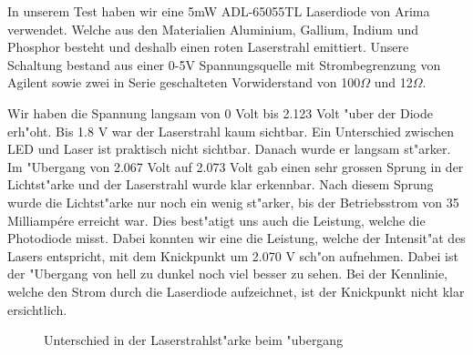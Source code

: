 \begin{refsection}
In unserem Test haben wir eine 5mW ADL-65055TL Laserdiode von Arima verwendet. 
Welche aus den Materialien Aluminium, Gallium, Indium und Phosphor besteht und 
deshalb einen roten Laserstrahl emittiert. Unsere Schaltung bestand aus einer 
0-5V Spannungsquelle mit Strombegrenzung von Agilent sowie zwei in Serie 
geschalteten Vorwiderstand von 100$\Omega$ und 12$\Omega$. 

Wir haben die Spannung langsam von 0 Volt bis 2.123 Volt "uber der Diode 
erh"oht. Bis 1.8 V war der Laserstrahl kaum sichtbar. Ein Unterschied zwischen 
LED und Laser ist praktisch nicht sichtbar. Danach wurde er langsam 
st"arker. Im "Ubergang von 2.067 Volt auf 2.073 Volt gab einen sehr grossen 
Sprung in der Lichtst"arke und der Laserstrahl wurde klar erkennbar.
Nach diesem Sprung wurde die Lichtst"arke nur noch 
ein wenig st"arker, bis der Betriebsstrom von 35 Milliampére erreicht war. 
Dies best"atigt uns auch die Leistung, welche die Photodiode misst. Dabei konnten wir eine 
die Leistung, welche der Intensit"at des Lasers entspricht,
mit dem Knickpunkt um 2.070 V sch"on aufnehmen. 
Dabei ist 
der "Ubergang von hell zu dunkel noch viel besser zu sehen. Bei der Kennlinie, 
welche den Strom durch die Laserdiode aufzeichnet, ist der Knickpunkt nicht 
klar ersichtlich.

\begin{figure}
\centering
{}\hfill
{}
\caption{Unterschied in der Laserstrahlst"arke beim "ubergang}
\label{fig:faecher}
\end{figure}


\end{refsection}
